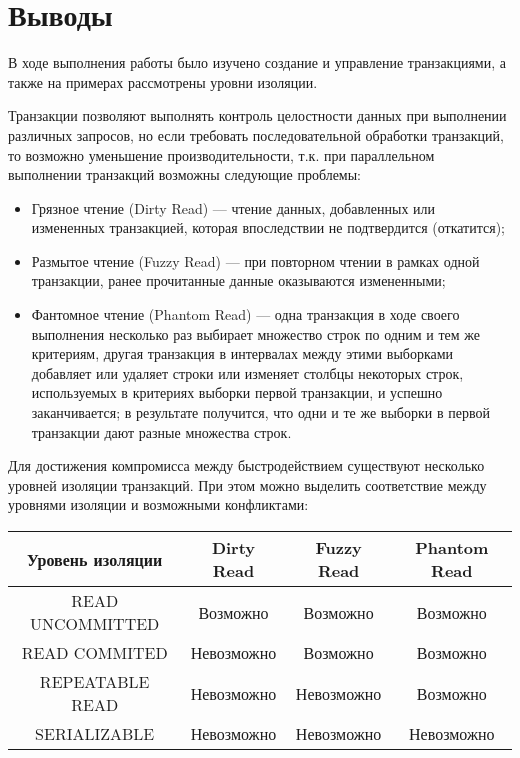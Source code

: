 \section{Выводы}

В ходе выполнения работы было изучено создание и управление транзакциями, а также на примерах рассмотрены уровни изоляции. 

Транзакции позволяют выполнять контроль целостности данных при выполнении различных запросов, но если требовать последовательной обработки транзакций, то возможно уменьшение производительности, т.к. при параллельном выполнении транзакций возможны следующие проблемы:

\begin{itemize}
	\item Грязное чтение (Dirty Read) --- чтение данных, добавленных или измененных транзакцией, которая впоследствии не подтвердится (откатится);
	\item Размытое чтение (Fuzzy Read) --- при повторном чтении в рамках одной транзакции, ранее прочитанные данные оказываются измененными;
	\item Фантомное чтение (Phantom Read) --- одна транзакция в ходе своего выполнения несколько раз выбирает множество строк по одним и тем же критериям, другая транзакция в интервалах между этими выборками добавляет или удаляет строки или изменяет столбцы некоторых строк, используемых в критериях выборки первой транзакции, и успешно заканчивается; в результате получится, что одни и те же выборки в первой транзакции дают разные множества строк.
\end{itemize}

Для достижения компромисса между быстродействием существуют несколько уровней изоляции транзакций. При этом можно выделить соответствие между уровнями изоляции и возможными конфликтами:

\begin{table}[H]
	\centering
	\begin{tabular}{|c|c|c|c|}
		\hline \textbf{Уровень изоляции} & \textbf{Dirty Read} & \textbf{Fuzzy Read} & \textbf{Phantom Read}      	\\
		\hline READ UNCOMMITTED          & Возможно            & Возможно            & Возможно         \\
		\hline READ COMMITED             & Невозможно          & Возможно            & Возможно         \\
		\hline REPEATABLE READ           & Невозможно          & Невозможно          & Возможно         \\
		\hline SERIALIZABLE              & Невозможно          & Невозможно          & Невозможно       \\
		\hline		
	\end{tabular}
\end{table}

